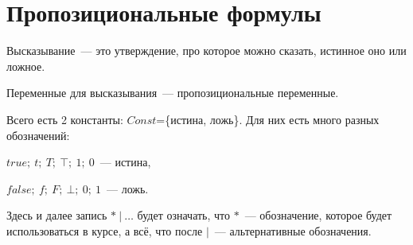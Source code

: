 \documentclass[main]{subfiles}
\begin{document}
\chapter{Пропозициональные формулы}
\begin{definition}[Высказывание]
    Высказывание~--- это утверждение, про которое можно сказать, истинное оно или ложное.
\end{definition}
\begin{definition}
    Переменные для высказывания~--- пропозициональные переменные.
\end{definition}
Всего есть 2 константы: $Const$=\{истина, ложь\}.
Для них есть много разных обозначений:

$true;\ t;\ T;\ \top;\ 1;\ 0$~--- истина,

$false;\ f;\ F;\ \bot;\ 0;\ 1$~--- ложь.

Здесь и далее запись $*\ |\ \dots$ будет означать, что $*$~--- обозначение, которое будет использоваться в курсе, а всё, что после $|$~--- альтернативные обозначения.
\end{document}
